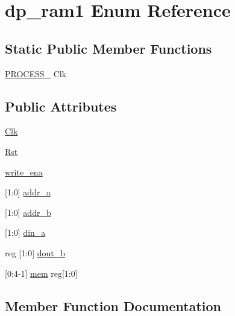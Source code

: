 \hypertarget{enumdp__ram1}{}\section{dp\+\_\+ram1 Enum Reference}
\label{enumdp__ram1}
\subsection*{Static Public Member Functions}
\begin{DoxyCompactItemize}
\item 
\mbox{\hyperlink{enumdp__ram1_a584926a2744bc26ef51f724f4c39fb9d}{P\+R\+O\+C\+E\+S\+S\+\_}} Clk
\end{DoxyCompactItemize}
\subsection*{Public Attributes}
\begin{DoxyCompactItemize}
\item 
\mbox{\hyperlink{enumdp__ram1_a9734a0746c03551a6c7c98c0878cbe91}{Clk}}
\item 
\mbox{\hyperlink{enumdp__ram1_a8a83b4e0022e3e5f6037a77885ef1d16}{Rst}}
\item 
\mbox{\hyperlink{enumdp__ram1_a11db501a3142a738e6d633e3d983a1a6}{write\+\_\+ena}}
\item 
\mbox{[}1\+:0\mbox{]} \mbox{\hyperlink{enumdp__ram1_a261e458dd78c7c377c2eeb13eb91d396}{addr\+\_\+a}}
\item 
\mbox{[}1\+:0\mbox{]} \mbox{\hyperlink{enumdp__ram1_a24c4d5897f7bf92743305f2d3bb7fac8}{addr\+\_\+b}}
\item 
\mbox{[}1\+:0\mbox{]} \mbox{\hyperlink{enumdp__ram1_a83fae4c242f596f8b12607b6542d033d}{din\+\_\+a}}
\item 
reg \mbox{[}1\+:0\mbox{]} \mbox{\hyperlink{enumdp__ram1_a4327a084334b83771955774170bc914d}{dout\+\_\+b}}
\item 
\mbox{[}0\+:4-\/1\mbox{]} \mbox{\hyperlink{enumdp__ram1_a151b37d47c7281cd78824f9bfa6179ab}{mem}} reg\mbox{[}1\+:0\mbox{]}
\end{DoxyCompactItemize}


\subsection{Member Function Documentation}
\mbox{\label{enumdp__ram1_a584926a2744bc26ef51f724f4c39fb9d}} 
